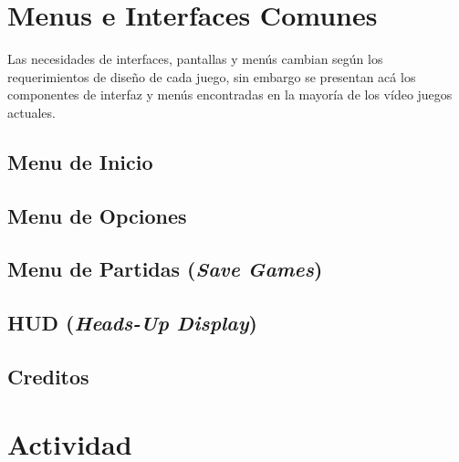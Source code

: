 \section{Menus e Interfaces Comunes}
Las necesidades de interfaces, pantallas y menús cambian según los requerimientos de diseño de cada juego, sin embargo se presentan acá los componentes de interfaz y menús encontradas en la mayoría de los vídeo juegos actuales.
\subsection{Menu de Inicio}
\subsection{Menu de Opciones}
\subsection{Menu de Partidas (\emph{Save Games})}
\subsection{HUD (\emph{Heads-Up Display})}
\subsection{Creditos}

\section{Actividad}
